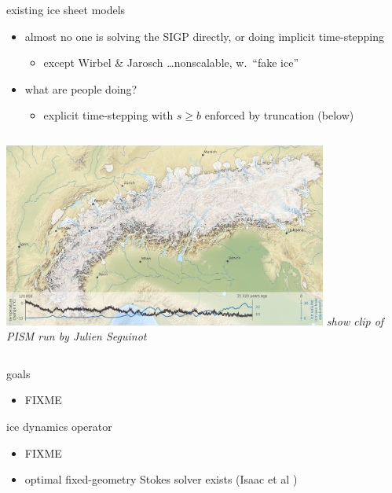 \documentclass{beamer}
\begin{document}
\begin{frame}{existing ice sheet models}

\begin{itemize}
\item almost no one is solving the SIGP directly, or doing implicit time-stepping
    \begin{itemize}
    \item except Wirbel \& Jarosch \cite{WirbelJarosch2020} \dots nonscalable, w.~``fake ice''
    \end{itemize}
\item what are people doing?
    \begin{itemize}
    \item \alert{explicit time-stepping with $s \ge b$ enforced by truncation} (below)
    \end{itemize}
\end{itemize}

\medskip
\begin{columns}
        \hfill \includegraphics[width=0.8\textwidth]{figs/seguinot.png}
        \scriptsize \emph{show clip of PISM run by Julien Seguinot}
\end{columns}
\end{frame}


\begin{frame}{goals}

\begin{itemize}
\item FIXME
\end{itemize}
\end{frame}


\begin{frame}{ice dynamics operator}

\begin{itemize}
\item FIXME
\item optimal fixed-geometry Stokes solver exists (Isaac et al \cite{IsaacStadlerGhattas2015})
\end{itemize}
\end{frame}
\end{document}
